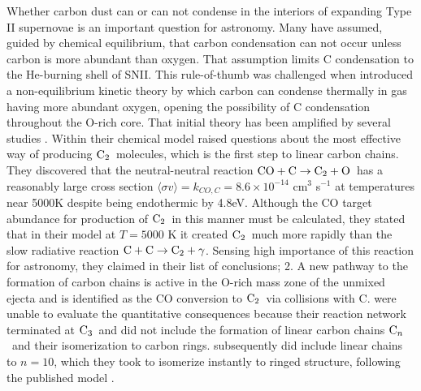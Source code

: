 \documentclass[manuscript]{aastex}
\newcommand{\ctwo}{{\rm C}_2}
\newcommand{\cthree}{{\rm C}_3}
\newcommand{\cenn}{{\rm C}_n}
\newcommand{\twoctoctwo}{${\rm C} + {\rm C} \to \ctwo + \gamma$}
\newcommand{\coctoctwo}{${\rm CO} + {\rm C} \to \ctwo + {\rm O}$}
\begin{document}
Whether carbon dust can or can not condense in the interiors of expanding 
Type II supernovae is an important question for astronomy. Many have 
assumed, guided by chemical equilibrium, that carbon condensation can 
not occur unless carbon is more abundant than oxygen. That assumption 
limits C condensation to the He-burning shell of SNII. This rule-of-thumb 
was challenged when \citet{1999Sci...283.1290C}
introduced a non-equilibrium kinetic theory by which carbon can 
condense thermally in gas having more abundant oxygen, opening the 
possibility of C condensation throughout the O-rich core. That 
initial theory has been amplified by several studies 
\citep{2001ApJ...562..480C,2003ApJ...594..312D,2006ApJ...638..234D,
2011NewAR..55..155C, 2013ApJ...762....5C}.
Within their chemical model \citet{2009ApJ...703..642C,2010ApJ...713....1C}
raised questions about the most effective way of producing $\ctwo$\ molecules, 
which is the first step to linear carbon chains. They discovered that 
the neutral-neutral reaction \coctoctwo\ has a reasonably large cross section 
$\langle \sigma v \rangle = k_{CO,C} = 8.6 \times 10^{-14}$ cm$^3$ s$^{-1}$
at temperatures near 5000K despite being endothermic by 4.8eV. 
Although the CO target abundance for production of $\ctwo$\ in this 
manner must be calculated, they stated that in their model 
at $T = 5000$ K it created $\ctwo$\ much more rapidly than the slow radiative 
reaction \twoctoctwo. Sensing high importance of this reaction for astronomy, 
they claimed in their list of conclusions; 2. A new pathway to the 
formation of carbon chains is active in the O-rich mass zone of the 
unmixed ejecta and is identified as the CO conversion to $\ctwo$\ via 
collisions with C. \citet{2009ApJ...703..642C} were unable to evaluate 
the quantitative consequences because their reaction network 
terminated at $\cthree$\ and did not include the formation of linear 
carbon chains $\cenn$\ and their isomerization to carbon rings. 
\citet{2010ApJ...713....1C} subsequently did include 
linear chains to $n=10$, which they took to isomerize instantly 
to ringed structure, following the published 
model \citet{1999Sci...283.1290C, 2001ApJ...562..480C}.
\end{document}
